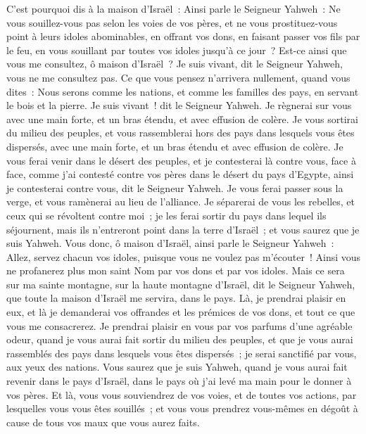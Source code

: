 \begin{multicols}{2}
C'est pourquoi dis à la maison d'Israël~: Ainsi parle le Seigneur Yahweh~: Ne vous souillez-vous pas selon les voies de vos pères, et ne vous prostituez-vous point à leurs idoles abominables,
en offrant vos dons, en faisant passer vos fils par le feu, en vous souillant par toutes vos idoles jusqu'à ce jour~? Est-ce ainsi que vous me consultez, ô maison d'Israël~? Je suis vivant, dit le Seigneur Yahweh, vous ne me consultez pas.
Ce que vous pensez n'arrivera nullement, quand vous dites~: Nous serons comme les nations, et comme les familles des pays, en servant le bois et la pierre.
Je suis vivant~! dit le Seigneur Yahweh. Je règnerai sur vous avec une main forte, et un bras étendu, et avec effusion de colère.
Je vous sortirai du milieu des peuples, et vous rassemblerai hors des pays dans lesquels vous êtes dispersés, avec une main forte, et un bras étendu et avec effusion de colère.
Je vous ferai venir dans le désert des peuples, et je contesterai là contre vous, face à face,
comme j'ai contesté contre vos pères dans le désert du pays d'Egypte, ainsi je contesterai contre vous, dit le Seigneur Yahweh.
Je vous ferai passer sous la verge, et vous ramènerai au lieu de l'alliance.
Je séparerai de vous les rebelles, et ceux qui se révoltent contre moi~; je les ferai sortir du pays dans lequel ils séjournent, mais ils n'entreront point dans la terre d'Israël~; et vous saurez que je suis Yahweh.
Vous donc, ô maison d'Israël, ainsi parle le Seigneur Yahweh~: Allez, servez chacun vos idoles, puisque vous ne voulez pas m'écouter~! Ainsi vous ne profanerez plus mon saint Nom par vos dons et par vos idoles.
Mais ce sera sur ma sainte montagne, sur la haute montagne d'Israël, dit le Seigneur Yahweh, que toute la maison d'Israël me servira, dans le pays. Là, je prendrai plaisir en eux, et là je demanderai vos offrandes et les prémices de vos dons, et tout ce que vous me consacrerez.
Je prendrai plaisir en vous par vos parfums d'une agréable odeur, quand je vous aurai fait sortir du milieu des peuples, et que je vous aurai rassemblés des pays dans lesquels vous êtes dispersés~; je serai sanctifié par vous, aux yeux des nations.
Vous saurez que je suis Yahweh, quand je vous aurai fait revenir dans le pays d'Israël, dans le pays où j'ai levé ma main pour le donner à vos pères.
Et là, vous vous souviendrez de vos voies, et de toutes vos actions, par lesquelles vous vous êtes souillés~; et vous vous prendrez vous-mêmes en dégoût à cause de tous vos maux que vous aurez faits.

\end{multicols}
